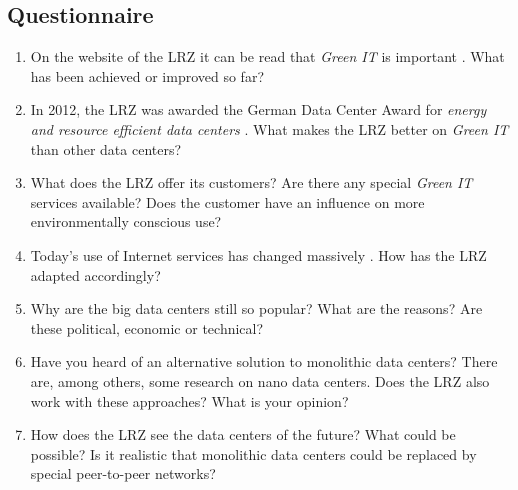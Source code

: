 \documentclass[sigchi-a, authorversion]{acmart}
\begin{document}
\nocite{*}



\begin{appendices}
\chapter{Questionnaire}
\begin{enumerate}
\label{appendix:quest}
\item On the website of the LRZ it can be read that \textit{Green IT} is important \cite{LRZGreenIT}. What has been achieved or improved so far?
\item In 2012, the LRZ was awarded the German Data Center Award for \textit{energy and resource efficient data centers} \cite{LRZGreenIT}. What makes the LRZ better on \textit{Green IT} than other data centers?
\item What does the LRZ offer its customers? Are there any special \textit{Green IT} services available? Does the customer have an influence on more environmentally conscious use?
\item Today's use of Internet services has changed massively \cite{TheZetta68:online}. How has the LRZ adapted accordingly?
\item Why are the big data centers still so popular? What are the reasons? Are these political, economic or technical?
\item Have you heard of an alternative solution to monolithic data centers? There are, among others, some research on nano data centers. Does the LRZ also work with these approaches? What is your opinion?
\item How does the LRZ see the data centers of the future? What could be possible? Is it realistic that monolithic data centers could be replaced by special peer-to-peer networks?
\end{enumerate}
\end{appendices}
\end{document}
